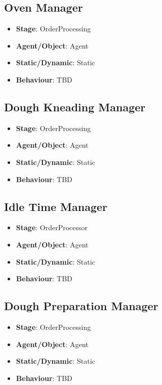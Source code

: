 \documentclass[12pt]{article}
\begin{document}
\subsection{Oven Manager}%
\label{sub:over_manager}
\begin{itemize}
    \item \textbf{Stage}: OrderProcessing
    \item \textbf{Agent/Object}: Agent
    \item \textbf{Static/Dynamic}: Static
    \item \textbf{Behaviour}: TBD
\end{itemize}

\subsection{Dough Kneading Manager}%
\label{sub:knead_manager}
\begin{itemize}
    \item \textbf{Stage}: OrderProcessing
    \item \textbf{Agent/Object}: Agent
    \item \textbf{Static/Dynamic}: Static
    \item \textbf{Behaviour}: TBD
\end{itemize}

\subsection{Idle Time Manager}%
\label{sub:idle_manager}
\begin{itemize}
    \item \textbf{Stage}: OrderProcessor
    \item \textbf{Agent/Object}: Agent
    \item \textbf{Static/Dynamic}: Static
    \item \textbf{Behaviour}: TBD
\end{itemize}

\subsection{Dough Preparation Manager}%
\label{sub:prep_manager}
\begin{itemize}
    \item \textbf{Stage}: OrderProcessing
    \item \textbf{Agent/Object}: Agent
    \item \textbf{Static/Dynamic}: Static
    \item \textbf{Behaviour}: TBD
\end{itemize}
\end{document}
